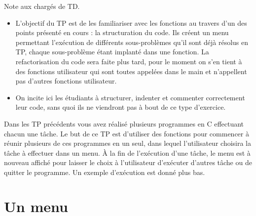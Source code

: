 



\begin{correction}
  Note aux chargés de TD.
  \begin{itemize}
  \item L'objectif du TP est de les familiariser avec les fonctions au
    travers d'un des points présenté en cours : la structuration du
    code. Ils créent un menu permettant l'exécution de différents
    sous-problèmes qu'il sont déjà résolus en TP, chaque sous-problème
    étant implanté dans une fonction. La refactorisation du code sera
    faite plus tard, pour le moment on s'en tient à des fonctions
    utilisateur qui
    sont toutes appelées dans le main et n'appellent pas d'autres
    fonctions utilisateur.
  \item On incite ici les étudiants à structurer, indenter et
    commenter correctement leur code, sans quoi ils ne viendront pas à
    bout de ce type d'exercice.
  \end{itemize}
\end{correction}

Dans les TP précédents vous avez réalisé plusieurs programmes en C
effectuant chacun une tâche. Le but de ce TP est d'utiliser des
fonctions pour commencer à réunir plusieurs de ces programmes en un
seul, dans lequel l'utilisateur choisira la tâche à effectuer dans un
menu. À la fin de l'exécution d'une tâche, le menu est à nouveau
affiché pour laisser le choix à l'utilisateur d'exécuter d'autres
tâche ou de quitter le programme. Un exemple d'exécution est donné
plus bas.

\section{Un menu}

